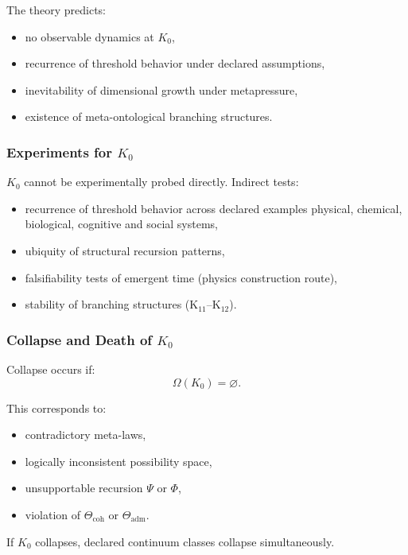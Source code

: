 The theory predicts:
\begin{itemize}
    \item no observable dynamics at $K_0$,
    \item recurrence of threshold behavior under declared assumptions,
    \item inevitability of dimensional growth under metapressure,
    \item existence of meta-ontological branching structures.
\end{itemize}

\subsubsection{Experiments for \texorpdfstring{$K_0$}{K_0}}

$K_0$ cannot be experimentally probed directly.
Indirect tests:
\begin{itemize}
    \item recurrence of threshold behavior across declared examples physical,
          chemical, biological, cognitive and social systems,
    \item ubiquity of structural recursion patterns,
    \item falsifiability tests of emergent time (physics construction route),
    \item stability of branching structures (K$_{11}$–K$_{12}$).
\end{itemize}

\subsubsection{Collapse and Death of \texorpdfstring{$K_0$}{K_0}}

Collapse occurs if:
\[
\Omega(K_0) = \varnothing.
\]

This corresponds to:
\begin{itemize}
    \item contradictory meta-laws,
    \item logically inconsistent possibility space,
    \item unsupportable recursion $\Psi$ or $\Phi$,
    \item violation of $\Theta_{\mathrm{coh}}$ or $\Theta_{\mathrm{adm}}$.
\end{itemize}

If $K_0$ collapses, declared continuum classes collapse simultaneously.


